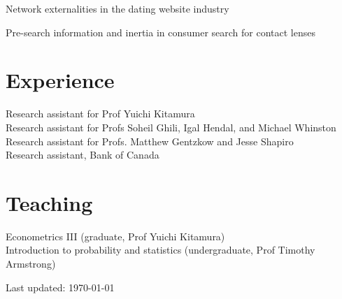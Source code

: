 \documentclass[11pt]{article} %
\begin{document}
Network externalities in the dating website industry

Pre-search information and inertia in consumer search for contact lenses

\section*{Experience}

 Research assistant for Prof Yuichi Kitamura \\
 Research assistant for Profs Soheil Ghili, Igal Hendal, and Michael Whinston \\
  Research assistant for Profs. Matthew Gentzkow and Jesse Shapiro \\
 Research assistant, Bank of Canada \\

\section*{Teaching}

 Econometrics III (graduate, Prof Yuichi Kitamura) \\
 Introduction to probability and statistics (undergraduate, Prof Timothy Armstrong)



\vfill %


\begin{center}
	\scriptsize
	Last updated: \today
\end{center}

\end{document}
